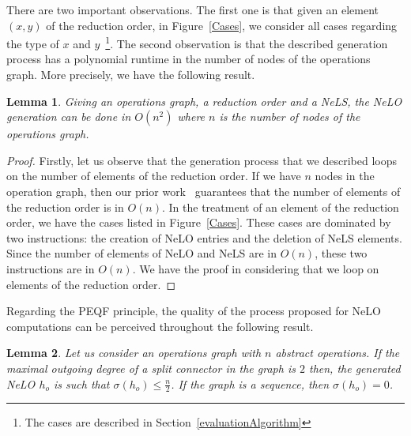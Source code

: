\documentclass[a4paper]{article}
\newtheorem{lemma}{Lemma}
\begin{document}
There are two important observations. The first one is that given an 
element $(x,y)$ of the reduction order, in Figure~\ref{Cases}, we consider all cases regarding 
the type of $x$ and $y$~\footnote{The cases are described in Section~\ref{evaluationAlgorithm}}. 
The second observation is that the described generation process has a polynomial runtime in the number of nodes 
of the operations graph. More precisely, we have the following result.

\begin{lemma}
Giving an operations graph, a reduction order and a NeLS, the NeLO generation can be 
done in $O(n^2)$ where $n$ is the number of nodes of the operations graph. 
\end{lemma}

\begin{proof}
Firstly, let us observe that the generation process that we described loops on the number of 
elements of the reduction order. If we have $n$ nodes in the operation graph, then our prior 
work~\cite{GoldmanNgoko} guarantees that the number of elements of the reduction order is in $O(n)$. 
In the treatment of an element of the reduction order, we have the cases listed in Figure~\ref{Cases}. 
These cases are dominated by two instructions: the creation of NeLO entries and the deletion of NeLS elements. 
Since the number of elements of NeLO and NeLS are in $O(n)$, these two instructions are in $O(n)$. 
We have the proof in considering that we loop on elements of the reduction order. 
\end{proof}


Regarding the PEQF principle, the quality of the process proposed for NeLO computations 
can be perceived throughout the following result. 

\begin{lemma}
Let us consider an operations graph with $n$ abstract operations. If the maximal outgoing degree of 
a split connector in the graph is $2$ then, the generated NeLO 
$h_o$ is such that $\displaystyle \sigma(h_o) \leq \frac{n}{2}$. If the graph is a sequence, then 
$\displaystyle \sigma(h_o) = 0$. 
\end{lemma}
\end{document}
